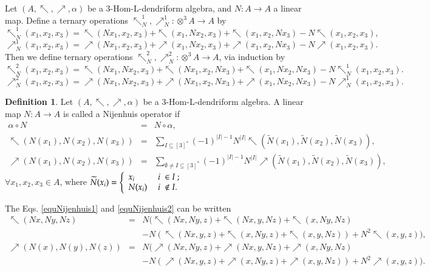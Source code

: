 \documentclass[a4paper,11pt]{article}
\def\nw{\nwarrow}
\def\ne{\nearrow}
\theoremstyle{definition}
\newtheorem{defi}{Definition}[section]
\begin{document}
Let $(A,\nw,\ne,\alpha)$ be a $3$-Hom-L-dendriform algebra, and $N:A\longrightarrow A$ a linear map. Define a ternary operations $\nw^1_N,\ne^1_N:\otimes^3 A \longrightarrow A $ by
{\small\begin{equation}\label{Nw1N}
\nw^1_N(x_1,x_2,x_3)=\nw(Nx_1,x_2,x_3)+\nw(x_1,Nx_2,x_3)+
\nw(x_1,x_2,Nx_3)-
N\nw(x_1,x_2,x_3),
\end{equation}\begin{equation}\label{Ne1N}
\ne^1_N(x_1,x_2,x_3)=\ne(Nx_1,x_2,x_3)+\ne(x_1,Nx_2,x_3)+
\ne(x_1,x_2,Nx_3)-
N\ne(x_1,x_2,x_3).
\end{equation}}
Then we define ternary operations  $\nw^2_N,\ne^2_N:\otimes^3 A \longrightarrow A $, via induction by
{\small\begin{equation}
\nw^2_N(x_1,x_2,x_3)=\nw(Nx_1,Nx_2,x_3)+\nw(Nx_1,x_2,Nx_3)+
\nw(x_1,Nx_2,Nx_3)-N\nw^1_N(x_1,x_2,x_3).
\end{equation}\begin{equation}
\ne^2_N(x_1,x_2,x_3)=\ne(Nx_1,Nx_2,x_3)+\ne(Nx_1,x_2,Nx_3)+
\ne(x_1,Nx_2,Nx_3)-N\ne^1_N(x_1,x_2,x_3).
\end{equation}}
\begin{defi}
Let $(A,\nw,\ne,\alpha)$ be a $3$-Hom-L-dendriform algebra. A linear map $N:A\rightarrow A$ is called a Nijenhuis operator
if
\begin{eqnarray}
\alpha\circ N&=& N\circ\alpha,\\
\label{equNijenhuis1}
\nw(N(x_1),N(x_2),N(x_3))&=&\displaystyle\sum_{ I\subseteq[3]^*}(-1)^{|I|-1}N^{|I|}\nw(\widetilde{N}(x_1),\widetilde{N}(x_2),\widetilde{N}(x_3)),
\\
\label{equNijenhuis2}
\ne(N(x_1),N(x_2),N(x_3))&=&\displaystyle\sum_{\emptyset\neq I\subseteq[3]^*}(-1)^{|I|-1}N^{|I|}\ne(\widetilde{N}(x_1),\widetilde{N}(x_2),\widetilde{N}(x_3)),
\end{eqnarray}
$\forall x_1,x_2,x_3\in A$, where
$\widetilde{N}(x_i)=\left\{
                       \begin{array}{ll}
                         x_i &\; i\;\in I \hbox{ ;} \\
                         N(x_i) & \; i\;\not\in I\hbox{.}
                       \end{array}
                     \right.$
\end{defi}
The Eqs. \eqref{equNijenhuis1} and \eqref{equNijenhuis2} can be written
\begin{eqnarray*}
\nw(Nx,Ny,Nz)&=&N(\nw(Nx,Ny,z)+\nw(Nx,y,Nz)+\nw(x,Ny,Nz)\nonumber\\
\label{equNijenhuis11}&&-N(\nw(Nx,y,z)+\nw(x,Ny,z)+\nw(x,y,Nz))+N^2\nw(x,y,z)),
\\
\ne(N(x),N(y),N(z))&=&N(\ne(Nx,Ny,z)+\ne(Nx,y,Nz)+\ne(x,Ny,Nz)\nonumber\\
\label{equNijenhuis12}&&-N(\ne(Nx,y,z)+\ne(x,Ny,z)+\ne(x,y,Nz))+N^2\ne(x,y,z)).
\end{eqnarray*}
\end{document}
